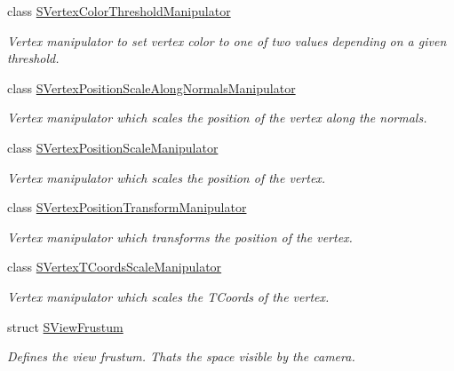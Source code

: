 \begin{DoxyCompactItemize}
class \hyperlink{classirr_1_1scene_1_1SVertexColorThresholdManipulator}{S\+Vertex\+Color\+Threshold\+Manipulator}
\begin{DoxyCompactList}\small\item\em Vertex manipulator to set vertex color to one of two values depending on a given threshold. \end{DoxyCompactList}\item 
class \hyperlink{classirr_1_1scene_1_1SVertexPositionScaleAlongNormalsManipulator}{S\+Vertex\+Position\+Scale\+Along\+Normals\+Manipulator}
\begin{DoxyCompactList}\small\item\em Vertex manipulator which scales the position of the vertex along the normals. \end{DoxyCompactList}\item 
class \hyperlink{classirr_1_1scene_1_1SVertexPositionScaleManipulator}{S\+Vertex\+Position\+Scale\+Manipulator}
\begin{DoxyCompactList}\small\item\em Vertex manipulator which scales the position of the vertex. \end{DoxyCompactList}\item 
class \hyperlink{classirr_1_1scene_1_1SVertexPositionTransformManipulator}{S\+Vertex\+Position\+Transform\+Manipulator}
\begin{DoxyCompactList}\small\item\em Vertex manipulator which transforms the position of the vertex. \end{DoxyCompactList}\item 
class \hyperlink{classirr_1_1scene_1_1SVertexTCoordsScaleManipulator}{S\+Vertex\+T\+Coords\+Scale\+Manipulator}
\begin{DoxyCompactList}\small\item\em Vertex manipulator which scales the T\+Coords of the vertex. \end{DoxyCompactList}\item 
struct \hyperlink{structirr_1_1scene_1_1SViewFrustum}{S\+View\+Frustum}
\begin{DoxyCompactList}\small\item\em Defines the view frustum. That\textquotesingle{}s the space visible by the camera. \end{DoxyCompactList}\end{DoxyCompactItemize}
